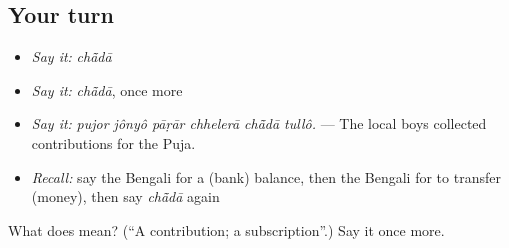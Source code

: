 \subsection*{Your turn}
\begin{itemize}
\raggedright
  \item \emph{Say it:} \emph{chā̃dā}
  \item \emph{Say it:} \emph{chā̃dā}, once more
  \item \emph{Say it:} \emph{pujor jônyô pāṛār chhelerā chā̃dā tullô.} — The local boys collected contributions for the Puja.
  \item \emph{Recall:} say the Bengali for a (bank) balance, then the Bengali for to transfer (money), then say \emph{chā̃dā} again
\end{itemize}

\begin{tcolorbox}[breakable,colback=teal!4,colframe=teal!35!black,title={Before you move on}]
What does  mean? (\textquotedblleft{}A contribution; a subscription\textquotedblright{}.) Say it once more.
\end{tcolorbox}
